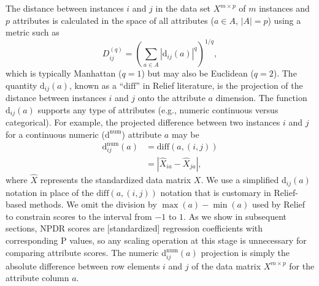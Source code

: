 \documentclass[10pt,letterpaper]{article}\usepackage[]{graphicx}\usepackage[]{color}
\def\ri{R_i}
\def\rj{R_j}
\begin{document}
The distance between instances $i$ and $j$ in the data set $X^{m \times p}$ of $m$ instances and $p$ attributes is calculated in the space of all attributes ($a \in A$, $|A|=p$) using a metric such as
\begin{equation}\label{eq:D}
D^{(q)}_{ij}=\left(\sum_{a\in A}|\text{d}_{ij}(a)|^q\right)^{1/q},
\end{equation}
which is typically Manhattan ($q=1$) but may also be Euclidean ($q=2$). The quantity 
$\text{d}_{ij}(a)$,
known as a ``$\text{diff}$'' in Relief literature, is the projection of the distance between instances $i$ and $j$ onto the attribute $a$ dimension. The 
function $\text{d}_{ij}(a)$ supports any type of attributes
(e.g., numeric continuous versus categorical).
For example, the projected difference between two instances $i$ and $j$ for a continuous numeric ($\text{d}^{\text{num}}$) attribute $a$ may be
\begin{equation}\label{eq:diff}
\begin{aligned}
\text{d}^{\text{num}}_{ij}(a)&=\text{diff}(a,(i,j))\\
                                            & = {|\hat{X}_{ia}-\hat{X}_{ja}|},
\end{aligned}
\end{equation}
where $\hat{X}$ represents the standardized data matrix $X$.
We use a simplified d$_{ij}(a)$ notation in place of the $\text{diff}(a,(i,j))$ notation that is customary in Relief-based methods.
We omit the division by $\max(a)-\min(a)$ used by Relief to constrain scores to the interval from $-1$ to $1$.
As we show in subsequent sections, NPDR scores are [standardized] regression coefficients with corresponding P values, so any scaling operation at this stage is unnecessary for comparing attribute scores. 
The numeric d$^{\text{num}}_{ij}(a)$ projection is simply the absolute difference between row elements $i$ and $j$ of the data matrix $X^{m \times p}$ for the attribute column $a$. 
\end{document}
